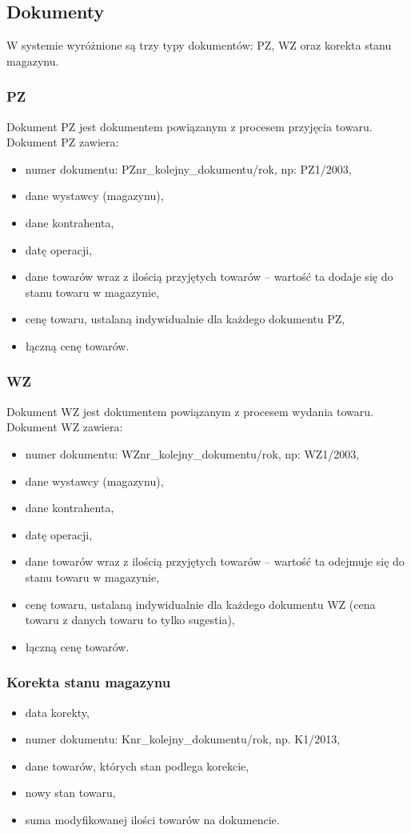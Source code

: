 \subsection{Dokumenty}
W systemie wyróżnione są trzy typy dokumentów: PZ, WZ oraz korekta
stanu magazynu.

\subsubsection{PZ}
Dokument PZ jest dokumentem powiązanym z procesem przyjęcia towaru.
Dokument PZ zawiera:
\begin{itemize}
\item numer dokumentu: PZnr\_kolejny\_dokumentu/rok, np: PZ1/2003,
\item dane wystawcy (magazynu),
\item dane kontrahenta,
\item datę operacji,
\item dane towarów wraz z ilością przyjętych towarów -- wartość ta
  dodaje się do stanu towaru w magazynie,
\item cenę towaru, ustalaną indywidualnie dla każdego dokumentu PZ,
\item łączną cenę towarów.
\end{itemize}

\subsubsection{WZ}
Dokument WZ jest dokumentem powiązanym z procesem wydania towaru.
Dokument WZ zawiera:
\begin{itemize}
\item numer dokumentu: WZnr\_kolejny\_dokumentu/rok, np: WZ1/2003,
\item dane wystawcy (magazynu),
\item dane kontrahenta,
\item datę operacji,
\item dane towarów wraz z ilością przyjętych towarów -- wartość ta
  odejmuje się do stanu towaru w magazynie,
\item cenę towaru, ustalaną indywidualnie dla każdego dokumentu WZ
  (cena towaru z danych towaru to tylko sugestia),
\item łączną cenę towarów.
\end{itemize}

\subsubsection{Korekta stanu magazynu}
\begin{itemize}
\item data korekty,
\item numer dokumentu: Knr\_kolejny\_dokumentu/rok, np. K1/2013,
\item dane towarów, których stan podlega korekcie,
\item nowy stan towaru,
\item suma modyfikowanej ilości towarów na dokumencie.
\end{itemize}

